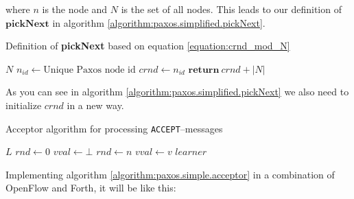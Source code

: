 where $n$ is the node and $N$ is the set of all nodes.  This leads to our
definition of $\textbf{pickNext}$ in algorithm
\ref{algorithm:paxos.simplified.pickNext}.

\begin{algorithm}
  \caption{Definition of \textbf{pickNext} based on equation \ref{equation:crnd_mod_N}}
  \label{algorithm:paxos.simplified.pickNext}
  \begin{algorithmic}
    \State $N$ 
    \State $n_{id} \gets \text{Unique Paxos node id}$
    \State $crnd \gets n_{id}$ 
    \State
      \State $\textbf{return}\ crnd + |N|$ 
    \EndFunction
  \end{algorithmic}
\end{algorithm}

As you can see in algorithm \ref{algorithm:paxos.simplified.pickNext} we
also need to initialize $crnd$ in a new way.

\begin{algorithm}
  \caption{Acceptor algorithm for processing \texttt{ACCEPT}--messages}
  \label{algorithm:paxos.simple.acceptor}
  \begin{algorithmic}
    \State $L$
    \State $rnd \gets 0$ 
    \State $vval \gets \bot$ 
    \State
        \State $rnd\gets n$
        \State $vval\gets v$
           \State {}
                         {$learner$}
        \EndForIn
      \EndIf
    \EndOn
  \end{algorithmic}
\end{algorithm}

Implementing algorithm \ref{algorithm:paxos.simple.acceptor} in a
combination of OpenFlow and Forth, it will be like this:

